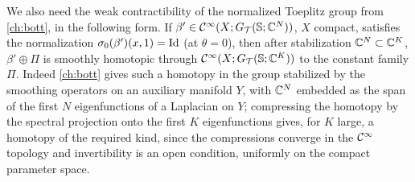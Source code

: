 We also need the weak contractibility of the normalized Toeplitz group from
\cref{ch:bott}, in the following form. If $\beta'\in\mathcal{C}^\infty(X;G_{\mathcal{T}}(\mathbb{S};\mathbb{C}^N))$, $X$
compact, satisfies the normalization $\sigma_0(\beta')(x,1)=\operatorname{Id}$ (at $\theta=0$), then
after stabilization $\mathbb{C}^N\subset\mathbb{C}^K$, $\beta'\oplus\Pi$ is smoothly homotopic through
$\mathcal{C}^\infty(X;G_{\mathcal{T}}(\mathbb{S};\mathbb{C}^K))$ to the constant family $\Pi$. Indeed \cref{ch:bott} gives
such a homotopy in the group stabilized by the smoothing operators on an auxiliary
manifold $Y$, with $\mathbb{C}^N$ embedded as the span of the first $N$ eigenfunctions of a
Laplacian on $Y$; compressing the homotopy by the spectral projection onto the first
$K$ eigenfunctions gives, for $K$ large, a homotopy of the required kind, since the
compressions converge in the $\mathcal{C}^\infty$ topology and invertibility is an open condition,
uniformly on the compact parameter space.

